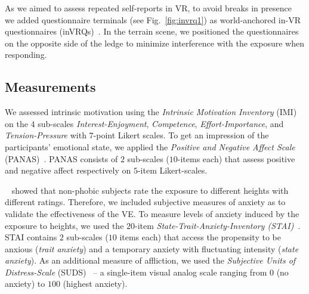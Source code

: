 As we aimed to assess repeated self-reports in \ac{VR}, to avoid breaks in presence~\cite{slater2000} we added questionnaire terminals (see Fig.~\ref{fig:invrq1}) as world-anchored in-VR questionnaires (inVRQs)~\cite{alexandrovsky2020,putze2020}. In the terrain scene, we positioned the questionnaires on the opposite side of the ledge to minimize interference with the exposure when responding.

\subsection{Measurements}
We assessed intrinsic motivation using the \textit{Intrinsic Motivation Inventory} (IMI)~\cite{ryan1982} on the $4$ sub-scales \textit{Interest-Enjoyment}, \textit{Competence}, \textit{Effort-Importance}, and \textit{Tension-Pressure} with $7$-point Likert scales. To get an impression of the participants' emotional state, we applied the \textit{Positive and Negative Affect Scale} (PANAS)~\cite{crawford2004}. PANAS consists of $2$ sub-scales ($10$-items each) that assess positive and negative affect respectively on $5$-item Likert-scales.

\citeauthor{cleworth2012}~\cite{cleworth2012} showed that non-phobic subjects rate the exposure to different heights with different ratings. Therefore, we included subjective measures of anxiety as to validate the effectiveness of the \ac{VE}.
To measure levels of anxiety induced by the exposure to heights, we used the $20$-item \textit{State-Trait-Anxiety-Inventory (STAI)}~\cite{spielberger1983}. STAI contains $2$ sub-scales ($10$ items each) that access the propensity to be anxious (\textit{trait anxiety}) and a temporary anxiety with fluctuating intensity (\textit{state anxiety}).
As an additional measure of affliction, we used the \textit{Subjective Units of Distress-Scale} (SUDS)~\cite{antony2005, back2015} -- a single-item visual analog scale ranging from $0$ (no anxiety) to $100$ (highest anxiety).




